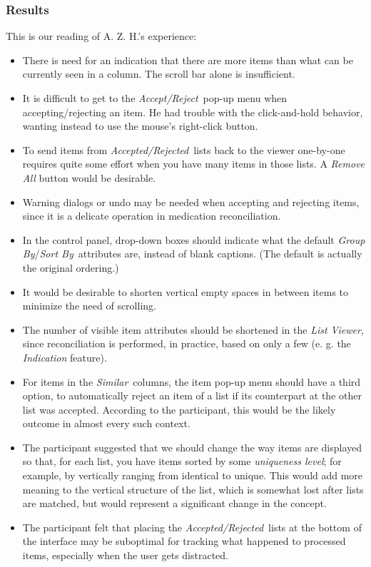 \documentclass{chi2009}
\newcommand{\ListViewer}{\textit{List Viewer}}
\newcommand{\AcceptReject}{\textit{Accept/Reject}}
\newcommand{\AcceptedRejected}{\textit{Accepted/Rejected}}
\newcommand{\GroupBy}{\textit{Group By}}
\newcommand{\SortBy}{\textit{Sort By}}
\newcommand{\Similar}{\textit{Similar}}
\begin{document}
\subsubsection{Results}
This is our reading of A. Z. H.'s experience:
\begin{itemize}
\item There is need for an indication that there are more items than what can be currently seen in a column. The scroll bar alone is insufficient.
\item It is difficult to get to the \AcceptReject~pop-up menu when accepting/rejecting an item. He had trouble with the click-and-hold behavior, wanting instead to use the mouse's right-click button.
\item To send items from \AcceptedRejected~lists back to the viewer one-by-one requires quite some effort when you have many items in those lists. A \textit{Remove All} button would be desirable.
\item Warning dialogs or undo may be needed when accepting and rejecting items, since it is a delicate operation in medication reconciliation.
\item In the control panel, drop-down boxes should indicate what the default \GroupBy/\SortBy~attributes are, instead of blank captions. (The default is actually the original ordering.)
\item It would be desirable to shorten vertical empty spaces in between items to minimize the need of scrolling.
\item The number of visible item attributes should be shortened in the \ListViewer, since reconciliation is performed, in practice, based on only a few (e. g. the \textit{Indication} feature).
\item For items in the \Similar~columns, the item pop-up menu should have a third option, to automatically reject an item of a list if its counterpart at the other list was accepted. According to the participant, this would be the likely outcome in almost every such context.
\item The participant suggested that we should change the way items are displayed so that, for each list, you have items sorted by some \textit{uniqueness level}; for example, by vertically ranging from identical to unique. This would add more meaning to the vertical structure of the list, which is somewhat lost after lists are matched, but would represent a significant change in the concept.
\item The participant felt that placing the \AcceptedRejected~lists at the bottom of the interface may be suboptimal for tracking what happened to processed items, especially when the user gets distracted.

\end{itemize}
\end{document}
